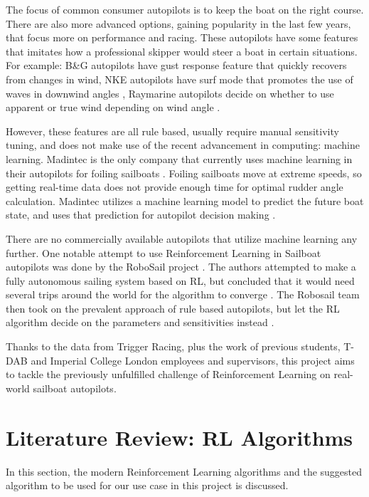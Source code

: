 \documentclass[12pt,twoside]{report}
\begin{document}
The focus of common consumer autopilots is to keep the boat on the right course. There are also more advanced options, gaining popularity in the last few years, that focus more on performance and racing. These autopilots have some features that imitates how a professional skipper would steer a boat in certain situations. For example: B\&G autopilots \cite{bandg} have gust response feature that quickly recovers from changes in wind, NKE autopilots \cite{nke} have surf mode that promotes the use of waves in downwind angles \cite{yachting_world_2020}, Raymarine autopilots \cite{raymarine} decide on whether to use apparent or true wind depending on wind angle \cite{cruising_world_2019}.

However, these features are all rule based, usually require manual sensitivity tuning, and does not make use of the recent advancement in computing: machine learning. Madintec is the only company that currently uses machine learning in their autopilots for foiling sailboats \cite{madintec}. Foiling sailboats move at extreme speeds, so getting real-time data does not provide enough time for optimal rudder angle calculation. Madintec utilizes a machine learning model to predict the future boat state, and uses that prediction for autopilot decision making \cite{madintec-eric}.

There are no commercially available autopilots that utilize machine learning any further. One notable attempt to use Reinforcement Learning in Sailboat autopilots was done by the RoboSail project \cite{robosail1}. The authors attempted to make a fully autonomous sailing system based on RL, but concluded that it would need several trips around the world for the algorithm to converge \cite{robosail2}. The Robosail team then took on the prevalent approach of rule based autopilots, but let the RL algorithm decide on the parameters and sensitivities instead \cite{robosail3}.

Thanks to the data from Trigger Racing, plus the work of previous students, T-DAB and Imperial College London employees and supervisors, this project aims to tackle the previously unfulfilled challenge of Reinforcement Learning on real-world sailboat autopilots.

\section{Literature Review: RL Algorithms}
In this section, the modern Reinforcement Learning algorithms and the suggested algorithm to be used for our use case in this project is discussed.
\end{document}
